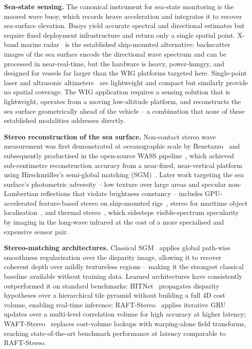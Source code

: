 \textbf{Sea-state sensing.}
The canonical instrument for sea-state monitoring is the moored wave buoy, which records heave acceleration and integrates it to recover sea-surface elevation. Buoys yield accurate spectral and directional estimates but require fixed deployment infrastructure and return only a single spatial point. X-band marine radar~\cite{rs9121261} is the established ship-mounted alternative: backscatter images of the sea surface encode the directional wave spectrum and can be processed in near-real-time, but the hardware is heavy, power-hungry, and designed for vessels far larger than the WIG platforms targeted here. Single-point laser and ultrasonic altimeters~\cite{toa2020ultrasonic} are lightweight and compact but similarly provide no spatial coverage. The WIG application requires a sensing solution that is lightweight, operates from a moving low-altitude platform, and reconstructs the sea surface geometrically ahead of the vehicle -- a combination that none of these established modalities addresses directly.

\textbf{Stereo reconstruction of the sea surface.}
Non-contact stereo wave measurement was first demonstrated at oceanographic scale by Benetazzo~\cite{benetazzo2006offshore} and subsequently productised in the open-source WASS pipeline~\cite{bergamasco2017wass}, which achieved sub-centimetre reconstruction accuracy from a near-fixed, near-vertical platform using Hirschmüller's semi-global matching (SGM)~\cite{hirschmuller2008stereo}. Later work targeting the sea surface's photometric adversity -- low texture over large areas and specular non-Lambertian reflections that violate brightness constancy -- includes GPU-accelerated feature-based stereo on ship-mounted rigs~\cite{app12157447}, stereo for maritime object localisation~\cite{jmse12010197}, and thermal stereo~\cite{li2025thermal}, which sidesteps visible-spectrum specularity by imaging in the long-wave infrared at the cost of a more specialised and expensive sensor pair.

\textbf{Stereo-matching architectures.}
Classical SGM~\cite{hirschmuller2008stereo} applies global path-wise smoothness regularisation over the disparity image, allowing it to recover coherent depth over mildly textureless regions -- making it the strongest classical baseline available without training data. Learned architectures have consistently outperformed it on standard benchmarks: HITNet~\cite{DBLP:journals/corr/abs-2007-12140} propagates disparity hypotheses over a hierarchical tile pyramid without building a full 4D cost volume, enabling real-time inference; RAFT-Stereo~\cite{DBLP:journals/corr/abs-2109-07547} applies iterative GRU updates over a multi-level correlation volume for high accuracy at higher latency; WAFT-Stereo~\cite{wang2026waftstereowarpingalonefieldtransforms} replaces cost-volume lookups with warping-alone field transforms, reaching state-of-the-art benchmark performance at latency comparable to RAFT-Stereo.

